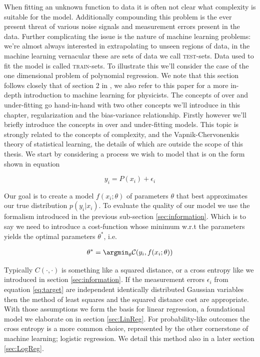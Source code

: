 When fitting an unknown function to data it is often not clear what complexity is suitable for the model. Additionally compounding this problem is the ever present threat of various noise signals and measurement errors present in the data. Further complicating the issue is the nature of machine learning problems: we're almost always interested in extrapolating to unseen regions of data, in the machine learning vernacular these are sets of data we call \textsc{test}-sets. Data used to fit the model is called  \textsc{train}-sets. To illustrate this we'll consider the case of the one dimensional problem of polynomial regression. We note that this section follows closely that of section 2 in \citet{Mehta2019}, we also refer to this paper for a more in-depth introduction to machine learning for physicists. The concepts of over and under-fitting go hand-in-hand with two other concepts we'll introduce in this chapter, regularization and the bias-variance relationship. Firstly however we'll briefly introduce the concepts in over and under-fitting models. This topic is strongly related to the concepts of complexity, and the Vapnik-Chervonenkis theory of statistical learning, the details of which are outside the scope of this thesis. We start by considering a process we wish to model that is on the form shown in equation \label{eq:target}

\begin{equation}\label{eq:target}
y_i = P(x_i) + \epsilon_i
\end{equation}

\noindent Our goal is to create a model $f(x_i; \theta)$ of parameters $\theta$ that best approximates our true distribution $p(y_i | x_i)$. To evaluate the quality of our model we use the formalism introduced in the previous sub-section \ref{sec:information}. Which is to say we need to introduce a cost-function whose minimum w.r.t the parameters yields the optimal parameters $\theta^*$, i.e. 

\begin{align}\label{eq:cost}
\theta^* = \argmin_\theta \mathcal{C}(y_i, f(x_i; \theta))
\end{align}

\noindent Typically $C(\cdot, \cdot)$ is something like a squared distance, or a cross entropy like we introduced in section \ref{sec:information}. If the measurement errors $\epsilon_i$ from equation \ref{eq:target} are independent identically distributed Gaussian variables then the method of least squares and the squared distance cost are appropriate. With those assumptions we form the basis for linear regression, a foundational model we elaborate on in section \ref{sec:LinReg}. For probability-like outcomes the cross entropy is a more common choice, represented by the other cornerstone of machine learning; logistic regression. We detail this method also in a later section \ref{sec:LogReg}. 

